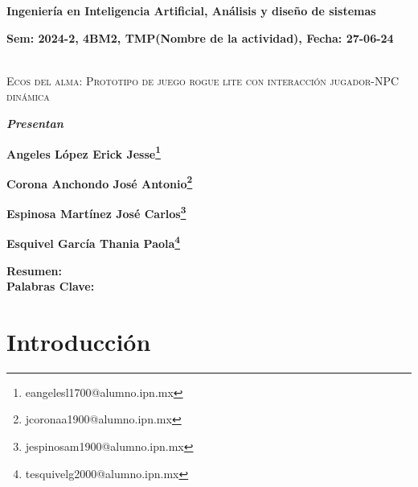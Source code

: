 \documentclass[12pt,twoside]{article}
\begin{document}
	
	\centerline{\bf Ingeniería en Inteligencia Artificial, Análisis y diseño de sistemas}
	
	\centerline{\bf Sem: 2024-2, 4BM2, TMP(Nombre de la actividad), Fecha: 27-06-24\\\\}
	
	\centerline{}
	
	
	
	\begin{center}
		\Large{\textsc{Ecos del alma: Prototipo de juego rogue lite con interacción jugador-NPC dinámica}} 
	\end{center}
	\centerline{}
	\centerline{\bf {\textit{Presentan}}}
	\centerline{}
	\centerline{\bf {Angeles López Erick Jesse\footnote{eangelesl1700@alumno.ipn.mx}}}
	\centerline{\bf {Corona Anchondo José Antonio\footnote{jcoronaa1900@alumno.ipn.mx}}}
	\centerline{\bf {	Espinosa Martínez José Carlos\footnote{jespinosam1900@alumno.ipn.mx}}}
	\centerline{\bf {Esquivel García Thania Paola\footnote{tesquivelg2000@alumno.ipn.mx}}}
	
	
	
	\newtheorem{Theorem}{\quad Theorem}[section]
	
	\newtheorem{Definition}[Theorem]{\quad Definition}
	
	\newtheorem{Corollary}[Theorem]{\quad Corollary}
	
	\newtheorem{Lemma}[Theorem]{\quad Lemma}
	
	\newtheorem{Example}[Theorem]{\quad Example}
	
	\bigskip
	
	\bigskip
	
	\textbf{Resumen:}  \\ 
	
	{\bf Palabras Clave:} \\
	
	\clearpage
	
	\tableofcontents
		
	\clearpage
		
	\section{Introducción}
	
	\clearpage
\end{document}

